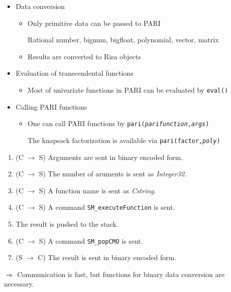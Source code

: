 \begin{slide}{}

\begin{itemize}
\item Data conversion

\begin{itemize}

\item Only primitive data can be passed to PARI

Rational number, bignum, bigfloat, polynomial,
vector, matrix

\item Results are converted to Risa objects

\end{itemize}

\item Evaluation of transcendental functions

\begin{itemize}
\item Most of univariate functions in PARI can be 
evaluated by {\tt eval()}
\end{itemize}

\item Calling PARI functions

\begin{itemize}
\item One can call PARI functions by {\tt pari({\it parifunction},{\it args})}

The knapsack factorization is available via {\tt pari(factor,{\it poly})}
\end{itemize}
\end{itemize}
\end{slide}

\begin{slide}{}

\begin{enumerate}
\item (C $\rightarrow$ S) Arguments are sent in binary encoded form.
\item (C $\rightarrow$ S) The number of aruments is sent as {\sl Integer32}.
\item (C $\rightarrow$ S) A function name is sent as {\sl Cstring}.
\item (C $\rightarrow$ S) A command {\tt SM\_executeFunction} is sent.
\item The result is pushed to the stack.
\item (C $\rightarrow$ S) A command {\tt SM\_popCMO} is sent.
\item (S $\rightarrow$ C) The result is sent in binary encoded form.
\end{enumerate}

$\Rightarrow$ Communication is fast, but functions for binary data
conversion are necessary.
\end{slide}

